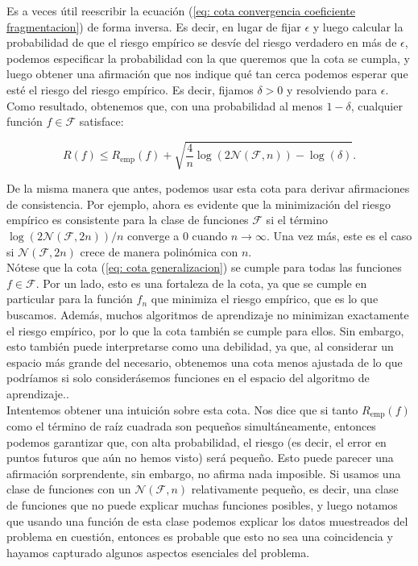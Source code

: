 \documentclass{article}
\begin{document}
Es a veces útil reescribir la ecuación (\ref{eq: cota convergencia coeficiente fragmentacion}) de forma inversa. Es decir, en lugar de 
fijar \(\epsilon\) y 
luego calcular la probabilidad de que el riesgo empírico se desvíe del riesgo verdadero en más de \(\epsilon\), 
podemos especificar la probabilidad con la que queremos que la cota se cumpla, y luego obtener una afirmación 
que nos indique qué tan cerca podemos esperar que esté el riesgo del riesgo empírico. Es decir, fijamos \(\delta > 0\) 
y resolviendo para \(\epsilon\). Como resultado, obtenemos que, con una probabilidad al menos \(1 - \delta\), cualquier 
función \(f \in \mathcal{F}\) satisface:

\begin{equation}
    R(f) \leq R_{\text{emp}}(f) + \sqrt{\frac{4}{n} \log(2\mathcal{N}(\mathcal{F}, n)) - \log(\delta)}. \label{eq: cota generalizacion}
\end{equation}


De la misma manera que antes, podemos usar esta cota para derivar afirmaciones de consistencia. Por ejemplo, 
ahora es evidente que la minimización del riesgo empírico es consistente para la clase de funciones \(\mathcal{F}\) 
si el término \(\log(2\mathcal{N}(\mathcal{F}, 2n))/n\) converge a \(0\) cuando \(n \to \infty\). Una vez más, 
este es el caso si \(\mathcal{N}(\mathcal{F}, 2n)\) crece de manera polinómica con \(n\).\\

Nótese que la cota (\ref{eq: cota generalizacion}) se cumple para todas las funciones \(f \in \mathcal{F}\). 
Por un lado, esto es una fortaleza 
de la cota, ya que se cumple en particular para la función \(f_n\) que minimiza el riesgo empírico, que es lo que 
buscamos. Además, muchos algoritmos de aprendizaje no minimizan exactamente el riesgo empírico, por lo que la cota 
también se cumple para ellos. Sin embargo, esto también puede interpretarse como una debilidad, ya que, al considerar 
un espacio más grande del necesario, obtenemos una cota menos ajustada de lo que podríamos si solo considerásemos
funciones en el espacio del algoritmo de aprendizaje..\\

Intentemos obtener una intuición sobre esta cota. Nos dice que si tanto \(R_{\text{emp}}(f)\) como el término 
de raíz cuadrada son pequeños simultáneamente, entonces podemos garantizar que, con alta probabilidad, el 
riesgo (es decir, el error en puntos futuros que aún no hemos visto) será pequeño. Esto puede parecer una 
afirmación sorprendente, sin embargo, no afirma nada imposible. Si usamos una clase de funciones con un 
\(\mathcal{N}(\mathcal{F}, n)\) relativamente pequeño, es decir, una clase de funciones que no puede explicar 
muchas funciones posibles, y luego notamos que usando una función de esta clase podemos explicar los datos muestreados 
del problema en cuestión, entonces es probable que esto no sea una coincidencia y hayamos capturado algunos aspectos 
esenciales del problema. \\
\end{document}
